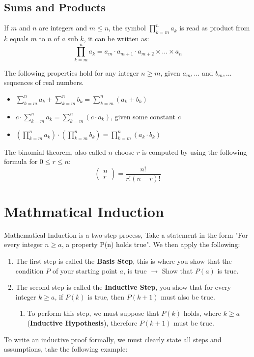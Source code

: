 \documentclass[a4paper]{article}
\begin{document}
    \subsection{Sums and Products}
    If $m$ and $n$ are integers and $m \le n$, the symbol $\prod_{k=m}^n a_k$ is read as product from $k$ equals $m$ to $n$ of $a$ sub $k$, it can be written as:
    $$
    \prod_{k=m}^n a_k = a_m \cdot a_{m+1} \cdot a_{m+2} \times \dots \times a_n
    $$
    \begin{theorem}
      The following properties hold for any integer $n \geq m$, given $a_m, \dots$ and $b_m,\dots$ sequences of real numbers.
      \begin{itemize}
        \item $\sum_{k=m }^{n} a_k + \sum_{k=m }^{n} b_k = \sum_{k=m }^{n} (a_k + b_k)$
        \item $c\cdot \sum_{k=m }^{n} a_k = \sum_{k=m }^{n} (c\cdot a_k)$, given some constant $c$
        \item $(\prod_{k=m}^{n}a_k) \cdot (\prod_{k=m}^{n}b_k) = \prod_{k=m}^{n} (a_k \cdot b_k)$
      \end{itemize}
    \end{theorem}
    \begin{theorem}
      The binomial theorem, also called $n$ choose $r$ is computed by using the following formula for $0 \le r \le n$:
      \begin{displaymath}
       \begin{pmatrix}
        n \\ r
       \end{pmatrix} 
       = \displaystyle\frac{n! }{r!(n-r)!}
      \end{displaymath}
    \end{theorem}
    
    
  \section{Mathmatical Induction} 
  Mathematical Induction is a two-step process, Take a statement in the form "For every integer $n \geq a $, a property P(n) holds true". We then apply the following:
  \begin{enumerate}
    \item The first step is called the \textbf{Basis Step}, this is where you show that the condition $P$ of your starting point $a$, is true $\rightarrow$ Show that $P(a)$ is true.
    \item The second step is called the \textbf{Inductive Step}, you show that for every integer $k \geq a$, if $P(k)$ is true, then $P(k+1)$ must also be true.
      \begin{enumerate}
        \item To perform this step, we must suppose that $P(k)$ holds, where $k \geq a$ (\textbf{Inductive Hypothesis}), therefore $P(k+1)$ must be true.
      \end{enumerate}
  \end{enumerate}
  To write an inductive proof formally, we must clearly state all steps and assumptions, take the following example:
\end{document}

